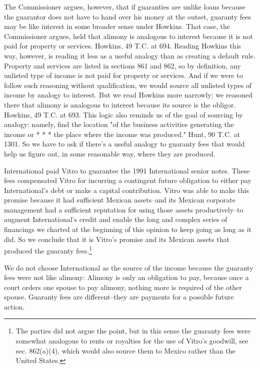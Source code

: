 \begin{select}
The Commissioner argues, however, that if guaranties are unlike loans because the guarantor does not have to hand over his money at the outset, guaranty fees may be like interest in some broader sense under Howkins. That case, the Commissioner argues, held that alimony is analogous to interest because it is not paid for property or services. Howkins, 49 T.C. at 694. Reading Howkins this way, however, is reading it less as a useful analogy than as creating a default rule. Property and services are listed in sections 861 and 862, so by definition, any unlisted type of income is not paid for property or services. And if we were to follow such reasoning without qualification, we would source all unlisted types of income by analogy to interest. But we read Howkins more narrowly; we reasoned there that alimony is analogous to interest because its source is the obligor. Howkins, 49 T.C. at 693. This logic also reminds us of the goal of sourcing by analogy: namely, find the location "of the business activities generating the income or * * * the place where the income was produced." Hunt, 90 T.C. at 1301. So we have to ask if there's a useful analogy to guaranty fees that would help us figure out, in some reasonable way, where they are produced.


International paid Vitro to guarantee the 1991 International senior notes. These fees compensated Vitro for incurring a contingent future obligation to either pay International's debt or make a capital contribution. Vitro was able to make this promise because it had sufficient Mexican assets--and its Mexican corporate management had a sufficient reputation for using those assets productively--to augment International's credit and enable the long and complex series of financings we charted at the beginning of this opinion to keep going as long as it did. So we conclude that it is Vitro's promise and its Mexican assets that produced the guaranty fees.\footnote[19]{The parties did not argue the point, but in this sense the guaranty fees were somewhat analogous to rents or royalties for the use of Vitro's goodwill, see sec. 862(a)(4), which would also source them to Mexico rather than the United States.}

We do not choose International as the source of the income because the guaranty fees were not like alimony: Alimony is only an obligation to pay, because once a court orders one spouse to pay alimony, nothing more is required of the other spouse. Guaranty fees are different--they are payments for a possible future action.


\end{select}
